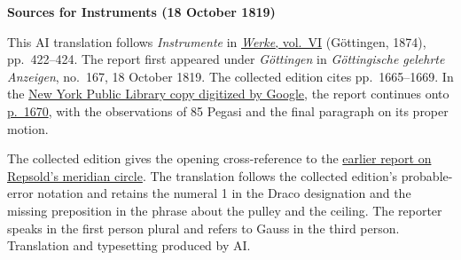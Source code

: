\clearpage\thispagestyle{empty}
\begin{center}\textbf{Sources for Instruments (18 October 1819)}\end{center}
\noindent This AI translation follows \textit{Instrumente} in \href{https://gdz.sub.uni-goettingen.de/id/PPN236007467}{\textit{Werke}, vol.~VI} (Göttingen, 1874), pp.~422--424. The report first appeared under \textit{Göttingen} in \textit{Göttingische gelehrte Anzeigen}, no.~167, 18 October 1819. The collected edition cites pp.~1665--1669. In the \href{https://books.google.com/books?id=SggWAAAAYAAJ&pg=PA1665}{New York Public Library copy digitized by Google}, the report continues onto \href{https://books.google.com/books?id=SggWAAAAYAAJ&pg=PA1670}{p.~1670}, with the observations of 85 Pegasi and the final paragraph on its proper motion.
\par\smallskip\noindent The collected edition gives the opening cross-reference to the \hyperlink{native-415}{earlier report on Repsold’s meridian circle}. The translation follows the collected edition’s probable-error notation and retains the numeral 1 in the Draco designation and the missing preposition in the phrase about the pulley and the ceiling. The reporter speaks in the first person plural and refers to Gauss in the third person. Translation and typesetting produced by AI.
\clearpage
